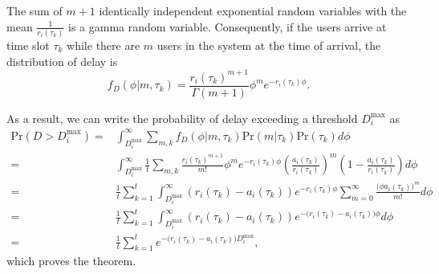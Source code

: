 \documentclass[journal,draftclsnofoot,onecolumn,12pt]{IEEEtran}%
\begin{document}
		The sum of $m+1$ identically independent exponential random variables with the mean $\frac{1}{r_i(\tau_k)}$ is a gamma random variable. Consequently, if the users arrive at time slot $\tau_k$ while there are $m$ users in the system at the time of arrival, the distribution of delay is
		\begin{equation}
		f_D(\phi|m,\tau_k)=\frac{r_i(\tau_k)^{m+1}}{\Gamma(m+1)}\phi^{m}e^{-r_i(\tau_k)\phi}.
		\end{equation}
		
		As a result, we can write the probability of delay exceeding a threshold $D_i^{\max}$ as
		\begin{align}
		\text{Pr}(D>D_i^{\max})=
		&\int_{D_i^{\max}}^{\infty} \sum_{m,k} f_D(\phi|m,\tau_k)\text{Pr}(m|\tau_k) \text{Pr}(\tau_k) d \phi\\
		= &\int_{D_i^{\max}}^{\infty} \frac{1}{t}\sum_{m,k} \frac{r_i(\tau_k)^{m+1}}{m!}\phi^{m}e^{-r_i(\tau_k)\phi}(\frac{a_i(\tau_k)}{r_i(\tau_k)})^m (1-\frac{a_i(\tau_k)}{r_i(\tau_k)}) d \phi\\
		=&\frac{1}{t}\sum_{k=1}^{t}\int_{D_i^{\max}}^\infty (r_i(\tau_k)-a_i(\tau_k))e^{-r_i(\tau_k)\phi}\sum_{m=0}^{\infty}\frac{\big(\phi a_i(\tau_k)\big)^m}{m!}d \phi\\
		=&\frac{1}{t}\sum_{k=1}^{t}\int_{D_i^{\max}}^\infty (r_i(\tau_k)-a_i(\tau_k))e^{-\big(r_i(\tau_k)-a_i(\tau_k)\big)\phi}d \phi\\
		=&\frac{1}{t}\sum_{k=1}^{t}e^{-\big(r_i(\tau_k)-a_i(\tau_k)\big)D_i^{\max}},
		\end{align}
	which proves the theorem.
	\nocite{*}
    \def\baselinestretch{1}
	
	
	
	
	
\end{document}
